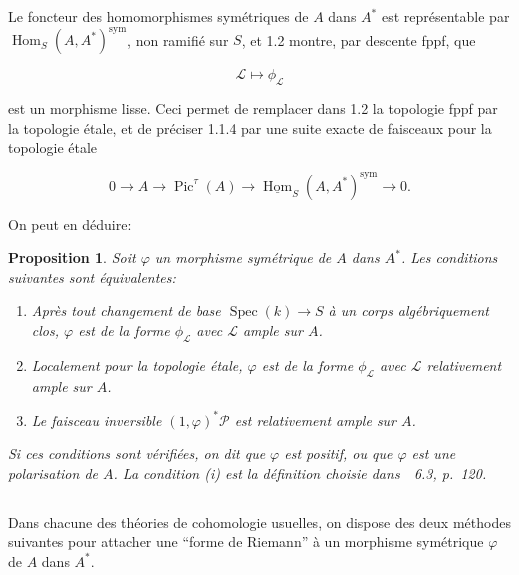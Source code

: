 \documentclass[11pt,a4paper]{article}
\theoremstyle{plain}
\newtheorem{proposition}[theorem]{Proposition}
\theoremstyle{definition}
\DeclareMathOperator{\Hom}{Hom}
\DeclareMathOperator{\Spec}{Spec}
\DeclareMathOperator{\Pic}{Pic}
\begin{document}
\subsection{}

Le foncteur des homomorphismes sym\'etriques de $A$ dans $A^*$ est repr\'esentable par $\Hom_S(A, A^*)^{\text{sym}}$, non ramifi\'e sur $S$, et 1.2 montre, par descente fppf,
que

\begin{equation}
\mathscr{L} \longmapsto \phi_{\mathscr{L}}
\end{equation}

est un morphisme lisse. Ceci permet de remplacer dans 1.2 la topologie fppf
par la topologie \'etale, et de pr\'eciser 1.1.4 par une suite exacte de faisceaux pour
la topologie \'etale

\begin{equation}
0 \longrightarrow A \longrightarrow \Pic^\tau(A) \longrightarrow \underline{\Hom}_S(A, A^*)^{\text{sym}} \longrightarrow 0.
\end{equation}

On peut en d\'eduire:

\begin{proposition}
Soit $\varphi$ un morphisme sym\'etrique de $A$ dans $A^*$. Les
conditions suivantes sont \'equivalentes:
\begin{enumerate}[label=(\roman*)]
\item Apr\`es tout changement de base $\Spec(k) \to S$ \`a un corps alg\'ebriquement clos,
$\varphi$ est de la forme $\phi_{\mathscr{L}}$ avec $\mathscr{L}$ ample sur $A$.
\item Localement pour la topologie \'etale, $\varphi$ est de la forme $\phi_{\mathscr{L}}$ avec $\mathscr{L}$ relativement
ample sur $A$.
\item Le faisceau inversible $(1, \varphi)^*\mathscr{P}$ est relativement ample sur $A$.
\end{enumerate}
Si ces conditions sont v\'erifi\'ees, on dit que $\varphi$ est positif, ou que $\varphi$ est une
polarisation de $A$. La condition (i) est la d\'efinition choisie dans~\cite{GIT}~6.3, p.~120.
\end{proposition}

\subsection{}

Dans chacune des th\'eories de cohomologie usuelles, on dispose des deux
m\'ethodes suivantes pour attacher une ``forme de Riemann'' \`a un morphisme
sym\'etrique $\varphi$ de $A$ dans $A^*$.
\end{document}
